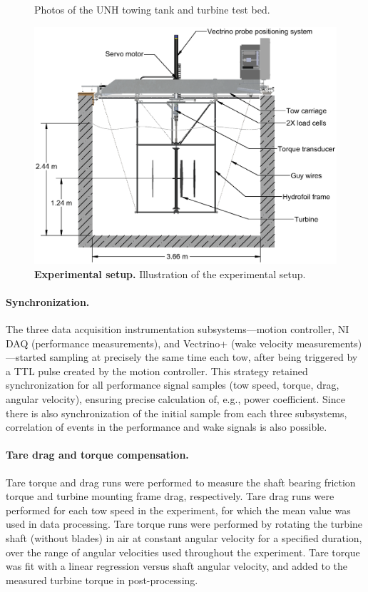 \documentclass[10pt,letterpaper]{article}
\begin{document}
\begin{figure}[h]
\caption{Photos of the UNH towing tank and turbine test bed.} 
\label{fig:tow-tank}
\end{figure}

\begin{figure}[h]
\centering
\includegraphics[clip,trim=0.01in 0 0 0,
width=\textwidth]{figures/tank_cross_section}
\caption{{\bf Experimental setup.} Illustration of the experimental setup.}
\label{fig:exp-setup}
\end{figure}

\paragraph{Synchronization.} The three data acquisition instrumentation
subsystems---motion controller, NI DAQ (performance measurements), and Vectrino+
(wake velocity measurements)---started sampling at precisely the same time each
tow, after being triggered by a TTL pulse created by the motion controller. This
strategy retained synchronization for all performance signal samples (tow speed,
torque, drag, angular velocity), ensuring precise calculation of, e.g., power
coefficient. Since there is also synchronization of the initial sample from each
three subsystems, correlation of events in the performance and wake signals is
also possible.

\paragraph{Tare drag and torque compensation.} Tare torque and drag runs were
performed to measure the shaft bearing friction torque and turbine mounting
frame drag, respectively. Tare drag runs were performed for each tow speed in
the experiment, for which the mean value was used in data processing. Tare
torque runs were performed by rotating the turbine shaft (without blades) in air
at constant angular velocity for a specified duration, over the range of angular
velocities used throughout the experiment. Tare torque was fit with a linear
regression versus shaft angular velocity, and added to the measured turbine
torque in post-processing.
\end{document}

